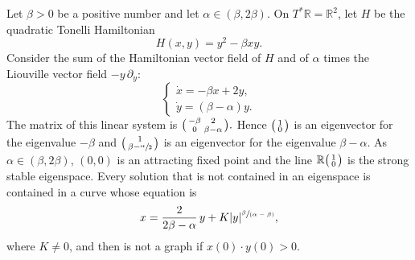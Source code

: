 \documentclass[JEP,XML,SOM,Unicode,published]{cedram}
\newcommand{\spfrac}[2]{\sfrac{#1}{(#2)}}
\newenvironment{smallpmatrix}{\big(\begin{smallmatrix}}{\end{smallmatrix}\big)}
\theoremstyle{definition}
\def\R{\mathbb{R}}
\begin{document}
Let $\beta>0$ be a positive number and let $\alpha\in(\beta, 2\beta)$. On $T^*\R=\R^2$, let $H$ be the quadratic Tonelli Hamiltonian
\[
H(x, y)=y^2-\beta xy.
\]
Consider the sum of the Hamiltonian vector field of $H$ and of $\alpha$ times the Liouville vector field $-y\, \partial_y$:
\begin{equation}\label{EPat1}
\begin{cases}
\dot x=-\beta x+2y,\\
\dot y=(\beta-\alpha) y.
\end{cases}
\end{equation}
The matrix of this linear system is $\begin{smallpmatrix} -\beta & 2 \\
0&\beta-\alpha
\end{smallpmatrix}.$ Hence $\begin{smallpmatrix} 1\\0
\end{smallpmatrix}$ is an eigenvector for the eigenvalue $-\beta$ and $\begin{smallpmatrix} 1\\ \beta-\sfrac{\alpha}{2}\end{smallpmatrix}$ is an eigenvector for the eigenvalue $\beta-\alpha$. As $\alpha\in(\beta, 2\beta)$, $(0,0)$ is an attracting fixed point and the line $\R\begin{smallpmatrix} 1\\ 0\end{smallpmatrix}$ is the strong stable eigenspace. Every solution that is not contained in an eigenspace is contained in a curve whose equation is
\[
x=\frac{2}{2\beta-\alpha}\,y+K\vert y\vert^{\spfrac{\beta}{\alpha-\beta}},
\]
where $K\not=0$, and then is not a graph if $x(0)\cdot y(0)>0$.

\begin{figure}[htb]
\end{figure}
\end{document}
